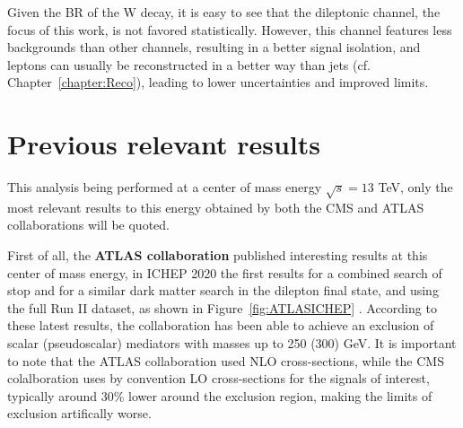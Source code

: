 \documentclass[a4paper, 10pt, openright]{report}
\begin{document}
Given the \ac{BR} of the W decay, it is easy to see that the dileptonic channel, the focus of this work, is not favored statistically. However, this channel features less backgrounds than other channels, resulting in a better signal isolation, and leptons can usually be reconstructed in a better way than jets (cf. Chapter~\ref{chapter:Reco}), leading to lower uncertainties and improved limits.

\section{Previous relevant results} \label{section:PreviousResults}

This analysis being performed at a center of mass energy $\sqrt{s} = 13$ TeV, only the most relevant results to this energy obtained by both the \ac{CMS} and \ac{ATLAS} collaborations will be quoted. 

%

First of all, the \textbf{\ac{ATLAS} collaboration} published interesting results at this center of mass energy, in ICHEP 2020 the first results for a combined search of stop and for a similar dark matter search in the dilepton final state, and using the full Run II dataset, as shown in Figure~\ref{fig:ATLASICHEP} \cite{ATLASICHEP2020}. According to these latest results, the collaboration has been able to achieve an exclusion of scalar (pseudoscalar) mediators with masses up to 250 (300) GeV. It is important to note that the \ac{ATLAS} collaboration used \ac{NLO} cross-sections, while the \ac{CMS} colalboration uses by convention \ac{LO} cross-sections for the signals of interest, typically around 30\% lower around the exclusion region, making the limits of exclusion artifically worse.
\end{document}
